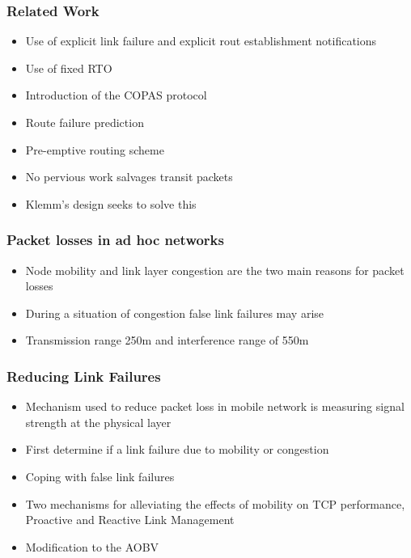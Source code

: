 \begin{frame}[t]
  \frametitle{Related Work}
  \begin{itemize}
  \item Use of explicit link failure and explicit rout establishment notifications
  \item Use of fixed RTO
  \item Introduction of the COPAS protocol
  \item Route failure prediction
  \item Pre-emptive routing scheme

  \item No pervious work salvages transit packets
  \item Klemm’s design seeks to solve this
  \end{itemize}

  \vfill

\end{frame}

\begin{frame}[t]
  \frametitle{Packet losses in ad hoc networks}
  \begin{itemize}
  \item Node mobility and link layer congestion are the two main reasons for packet losses
  \item During a situation of congestion false link failures may arise
  \item Transmission range 250m and interference range of 550m
  \end{itemize}

  \vfill

\end{frame}

\begin{frame}[t]
  \frametitle{Reducing Link Failures}
  \begin{itemize}
  \item Mechanism used to reduce packet loss in mobile network is measuring signal strength at the physical layer
  \item First determine if a link failure due to mobility or congestion
  \item Coping with false link failures
  \item Two mechanisms for alleviating the effects of mobility on TCP performance, Proactive and Reactive Link Management
  \item Modification to the AOBV
  \end{itemize}

  \vfill

\end{frame}

